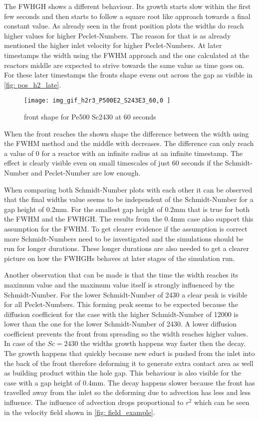 \documentclass[../thesis.tex]{subfiles}
\begin{document}
The FWHGH shows a different behaviour. Its growth starts slow within the first few seconds and then starts to follow a square root like approach towards a final constant value. As already seen in the front position plots the widths do reach higher values for higher Peclet-Numbers. The reason for that is as already mentioned the higher inlet velocity for higher Peclet-Numbers. At later timestamps the width using the FWHM approach and the one calculated at the reactors middle are expected to strive towards the same value as time goes on. For these later timestamps the fronts shape evens out across the gap as visible in \autoref{fig: pos_h2_late}.
\begin{figure}[htb]
	\centering
	\texttt{[image: img\_gif\_h2r3\_P500E2\_S243E3\_60,0 ]}
	\caption{front shape for Pe500 Sc2430 at 60 seconds}
	\label{fig: pos_h2_late}
\end{figure}
When the front reaches the shown shape the difference between the width using the FWHM method and the middle with decreases. The difference can only reach a value of 0 for a reactor with an infinite radius at an infinite timestamp. The effect is clearly visible even on small timescales of just 60 seconds if the Schmidt-Number and Peclet-Number are low enough.

When comparing both Schmidt-Number plots with each other it can be observed that the final widths value seems to be independent of the Schmidt-Number for a gap height of 0.2mm. For the smallest gap height of 0.2mm that is true for both the FWHM and the  FWHGH. The results from the 0.4mm case also support this assumption for the FWHM. To get clearer evidence if the assumption is correct more Schmidt-Numbers need to be investigated and the simulations should be run for longer durations. These longer durations are also needed to get a clearer picture on how the FWHGHs behaves at later stages of the simulation run.

Another observation that can be made is that the time the width reaches its maximum value and the maximum value itself is strongly influenced by the Schmidt-Number. For the lower Schmidt-Number of 2430 a clear peak is visible for all Peclet-Numbers. This forming peak seems to be expected because the diffusion coefficient for the case with the higher Schmidt-Number of 12000 is lower than the one for the lower Schmidt-Number of 2430. A lower diffusion coefficient prevents the front from spreading so the width reaches higher values. In case of the $Sc = 2430$ the widths growth happens way faster then the decay. The growth happens that quickly because new educt is pushed from the inlet into the back of the front therefore deforming it to generate extra contact area as well as building product within the hole gap. This behaviour is also visible for the case with a gap height of 0.4mm. The decay happens slower because the front has travelled away from the inlet so the deforming due to advection has less and less influence. The influence of advection drops proportional to $r^2$ which can be seen in the velocity field shown in \autoref{fig: field_example}.
\newline
\end{document}
